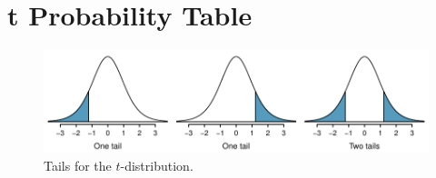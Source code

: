 \section{t Probability Table}
\label{tDistributionTable}

\begin{figure}[h]
\centering
\includegraphics[width=\textwidth]{extraTeX/appendix/figures/tTails/tTails}
\caption{Tails for the $t$-distribution.}
\label{tTails}
\end{figure}

